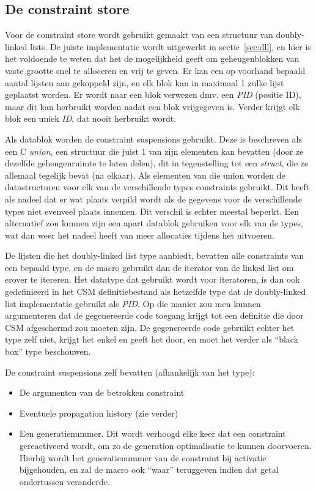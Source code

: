 \subsection{De constraint store} \label{sec:constore}

Voor de constraint store wordt gebruikt gemaakt van een structuur van doubly-linked lists. De juiste implementatie wordt uitgewerkt in sectie~\ref{sec:dll}, en hier is het voldoende te weten dat het de mogelijkheid geeft om geheugenblokken van vaste grootte snel te alloceren en vrij te geven. Er kan een op voorhand bepaald aantal lijsten aan gekoppeld zijn, en elk blok kan in maximaal 1 zulke lijst geplaatst worden. Er wordt naar een blok verwezen dmv. een {\em PID} (positie ID), maar dit kan herbruikt worden nadat een blok vrijgegeven is. Verder krijgt elk blok een uniek {\em ID}, dat nooit herbruikt wordt.

Als datablok worden de constraint suspensions gebruikt. Deze is beschreven als een C {\em union}, een structuur die juist 1 van zijn elementen kan bevatten (door ze dezelfde geheugenruimte te laten delen), dit in tegenstelling tot een {\em struct}, die ze allemaal tegelijk bevat (na elkaar). Als elementen van die union worden de datastructuren voor elk van de verschillende types constraints gebruikt. Dit heeft als nadeel dat er wat plaats verpild wordt als de gegevens voor de verschillende types niet evenveel plaats innemen. Dit verschil is echter meestal beperkt. Een alternatief zou kunnen zijn een apart datablok gebruiken voor elk van de types, wat dan weer het nadeel heeft van meer allocaties tijdens het uitvoeren.

De lijsten die het doubly-linked list type aanbiedt, bevatten alle constraints van een bepaald type, en de  macro gebruikt dan de iterator van de linked list om erover te itereren. Het  datatype dat gebruikt wordt voor iteratoren, is dan ook gedefinieerd in het CSM definitiebestand als hetzelfde type dat de doubly-linked list implementatie gebruikt als {\em PID}. Op die manier zou men kunnen argumenteren dat de gegenereerde code toegang krijgt tot een definitie die door CSM afgeschermd zou moeten zijn. De gegenereerde code gebruikt echter het  type zelf niet, krijgt het enkel en geeft het door, en moet het verder als ``black box'' type beschouwen.

De constraint suspensions zelf bevatten (afhankelijk van het type): \begin{itemize}
  \item De argumenten van de betrokken constraint
  \item Eventuele propagation history (zie verder)
  \item Een generatienummer. Dit wordt verhoogd elke keer dat een constraint gereactiveerd wordt, om zo de generation optimalisatie te kunnen doorvoeren. Hierbij wordt het generatienummer van de constraint bij activatie bijgehouden, en zal de  macro ook ``waar'' teruggeven indien dat getal ondertussen veranderde.
\end{itemize}

